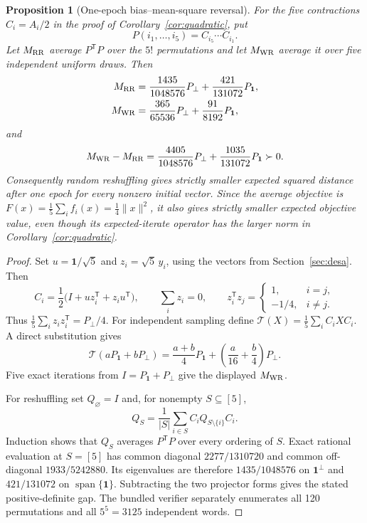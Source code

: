 \documentclass[11pt]{article}
\newtheorem{proposition}[theorem]{Proposition}
\newcommand{\one}{\mathbf 1}
\begin{document}
\begin{proposition}[One-epoch bias--mean-square reversal]
\label{prop:metric-reversal}
For the five contractions \(C_i=A_i/2\) in the proof of
Corollary~\ref{cor:quadratic}, put
\[
 P(i_1,\ldots,i_5)=C_{i_5}\cdots C_{i_1}.
\]
Let \(M_{\rm RR}\) average \(P^{\mathsf T}P\) over the \(5!\) permutations
and let \(M_{\rm WR}\) average it over five independent uniform draws.  Then
\begin{align*}
 M_{\rm RR}
 &=\frac{1435}{1048576}P_{\perp}
   +\frac{421}{131072}P_{\one},\\
 M_{\rm WR}
 &=\frac{365}{65536}P_{\perp}
   +\frac{91}{8192}P_{\one},
\end{align*}
and
\[
 M_{\rm WR}-M_{\rm RR}
 =\frac{4405}{1048576}P_{\perp}
  +\frac{1035}{131072}P_{\one}\succ0.
\]
Consequently random reshuffling gives strictly smaller expected squared
distance after one epoch for every nonzero initial vector.  Since the average
objective is \(F(x)=\frac15\sum_i f_i(x)=\frac14\|x\|^2\), it also gives
strictly smaller expected objective value, even though its expected-iterate
operator has the larger norm in Corollary~\ref{cor:quadratic}.
\end{proposition}

\begin{proof}
Set \(u=\one/\sqrt5\) and \(z_i=\sqrt5\,y_i\), using the vectors from
Section~\ref{sec:desa}.  Then
\[
 C_i=\frac12\bigl(I+uz_i^{\mathsf T}+z_iu^{\mathsf T}\bigr),\qquad
 \sum_i z_i=0,\qquad
 z_i^{\mathsf T}z_j=
 \begin{cases}1,&i=j,\\-1/4,&i\ne j.\end{cases}
\]
Thus \(\frac15\sum_i z_iz_i^{\mathsf T}=P_{\perp}/4\).  For independent
sampling define \(\mathcal T(X)=\frac15\sum_iC_iXC_i\).  A direct substitution
gives
\[
 \mathcal T(aP_{\one}+bP_{\perp})
 =\frac{a+b}{4}P_{\one}
  +\left(\frac{a}{16}+\frac b4\right)P_{\perp}.
\]
Five exact iterations from \(I=P_{\one}+P_{\perp}\) give the displayed
\(M_{\rm WR}\).

For reshuffling set \(Q_{\varnothing}=I\) and, for nonempty
\(S\subseteq[5]\),
\[
 Q_S=\frac1{|S|}\sum_{i\in S}C_iQ_{S\setminus\{i\}}C_i.
\]
Induction shows that \(Q_S\) averages \(P^{\mathsf T}P\) over every ordering
of \(S\).  Exact rational evaluation at \(S=[5]\) has common diagonal
\(2277/1310720\) and common off-diagonal \(1933/5242880\).  Its eigenvalues
are therefore \(1435/1048576\) on \(\one^\perp\) and \(421/131072\) on
\(\operatorname{span}\{\one\}\).  Subtracting the two projector forms gives
the stated positive-definite gap.  The bundled verifier separately enumerates
all 120 permutations and all \(5^5=3125\) independent words.
\end{proof}
\end{document}
